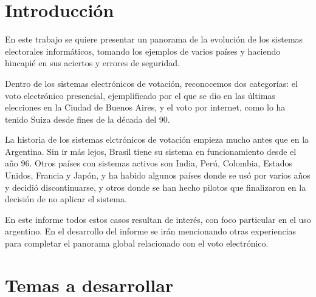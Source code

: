 \documentclass[11pt]{article}
\begin{document}


\maketitle
\pagebreak

\tableofcontents

\pagebreak

\section{Introducción}

En este trabajo se quiere presentar un panorama de la evolución de los sistemas electorales informáticos, tomando los ejemplos de varios países y haciendo hincapié en sus aciertos y errores de seguridad.

Dentro de los sistemas electrónicos de votación, reconocemos dos categorías: el voto electrónico presencial, ejemplificado por el que se dio en las últimas elecciones en la Ciudad de Buenos Aires, y el voto por internet, como lo ha tenido Suiza desde fines de la década del 90\cite{gerlach}.

La historia de los sistemas elctrónicos de votación empieza mucho antes que en la Argentina. Sin ir más lejos, Brasil tiene su sistema en funcionamiento desde el año 96\cite{corteBrasil}. Otros países con sistemas activos son India, Perú, Colombia, Estados Unidos, Francia y Japón, y ha habido algunos países donde se usó por varios años y decidió discontinuarse, y otros donde se han hecho pilotos que finalizaron en la decisión de no aplicar el sistema\cite{ndi}.

En este informe todos estos casos resultan de interés, con foco particular en el uso argentino. En el desarrollo del informe se irán mencionando otras experiencias para completar el panorama global relacionado con el voto electrónico.

\section{Temas a desarrollar}
\end{document}
